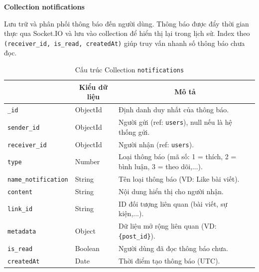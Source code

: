 \textbf{Collection notifications}
\label{subsec:col_notifications}

Lưu trữ và phân phối thông báo đến người dùng. Thông báo được đẩy thời gian thực qua Socket.IO và lưu vào collection để hiển thị lại trong lịch sử. Index theo \texttt{(receiver\_id, is\_read, createdAt)} giúp truy vấn nhanh số thông báo chưa đọc.

\begin{table}[H]
\centering
\footnotesize
\setlength{\tabcolsep}{5pt}
\renewcommand{\arraystretch}{1.15}
\begin{tabularx}{\textwidth}{|p{3.8cm}|p{2.6cm}|X|}
\hline
\rowcolor{dbheadblue}
\multicolumn{1}{|c|}{\color{white}\textbf{Trường}} &
\multicolumn{1}{c|}{\color{white}\textbf{Kiểu dữ liệu}} &
\multicolumn{1}{c|}{\color{white}\textbf{Mô tả}} \\
\hline
\texttt{\_id}                 & ObjectId      & Định danh duy nhất của thông báo. \\ \hline
\rowcolor{dbrowalt}
\texttt{sender\_id}           & ObjectId      & Người gửi (ref: \texttt{users}), null nếu là hệ thống gửi. \\ \hline
\texttt{receiver\_id}         & ObjectId      & Người nhận (ref: \texttt{users}). \\ \hline
\rowcolor{dbrowalt}
\texttt{type}                & Number        & Loại thông báo (mã số: 1 = thích, 2 = bình luận, 3 = theo dõi,...). \\ \hline
\texttt{name\_notification}   & String        & Tên loại thông báo (VD: Like bài viết). \\ \hline
\rowcolor{dbrowalt}
\texttt{content}             & String        & Nội dung hiển thị cho người nhận. \\ \hline
\texttt{link\_id}             & String        & ID đối tượng liên quan (bài viết, sự kiện,...). \\ \hline
\rowcolor{dbrowalt}
\texttt{metadata}            & Object        & Dữ liệu mở rộng liên quan (VD: \texttt{\{post\_id\}}). \\ \hline
\texttt{is\_read}             & Boolean       & Người dùng đã đọc thông báo chưa. \\ \hline
\rowcolor{dbrowalt}
\texttt{createdAt}           & Date          & Thời điểm tạo thông báo (UTC). \\ \hline
\end{tabularx}
\caption{Cấu trúc Collection \texttt{notifications}}
\label{tab:col_notifications}
\end{table}


